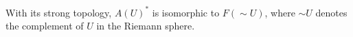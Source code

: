 With its strong topology, $A(U)^*$ is isomorphic to $F(\sim U)$, where $\sim U$ denotes the complement of $U$ in the Riemann sphere.

